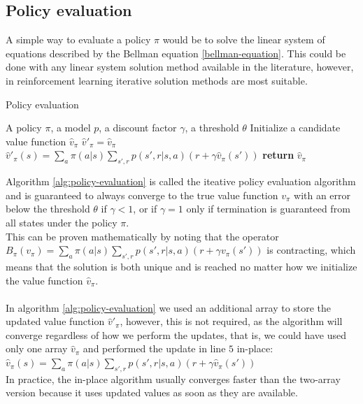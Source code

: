 \subsection{Policy evaluation}
A simple way to evaluate a policy $\pi$ would be to solve the linear system of equations described by the Bellman equation \eqref{bellman-equation}. This could be done with any linear system solution method available in the literature, however, in reinforcement learning iterative solution methods are most suitable.
\begin{algorithm}[H]
    \caption{Policy evaluation}
    \label{alg:policy-evaluation}
    \begin{algorithmic}[1]
        \Require A policy $\pi$, a model $p$, a discount factor $\gamma$, a threshold $\theta$
        \State Initialize a candidate value function $\hat{v}_{\pi}$
            \State $\hat{v}'_{\pi} = \hat{v}_{\pi}$
                \State $\hat{v}'_{\pi}(s) = \sum_a \pi(a | s) \sum_{s', r} p(s', r | s, a) (r + \gamma \hat{v}_{\pi}(s'))$
            \EndFor
                \State \textbf{return} $\hat{v}_{\pi}$
            \EndIf
        \EndWhile
    \end{algorithmic}
\end{algorithm}
Algorithm \ref{alg:policy-evaluation} is called the iteative policy evaluation algorithm and is guaranteed to always converge to the true value function $v_{\pi}$ with an error below the threshold $\theta$ if $\gamma < 1$, or if $\gamma = 1$ only if termination is guaranteed from all states under the policy $\pi$.\\
This can be proven mathematically by noting that the operator $B_{\pi}(v_{\pi}) = \sum_a \pi(a | s) \sum_{s', r} p(s', r | s, a) (r + \gamma v_{\pi}(s'))$ is contracting, which means that the solution is both unique and is reached no matter how we initialize the value function $\hat{v}_{\pi}$.\\\\
In algorithm \ref{alg:policy-evaluation} we used an additional array to store the updated value function $\hat{v}'_{\pi}$, however, this is not required, as the algorithm will converge regardless of how we perform the updates, that is, we could have used only one array $\hat{v}_{\pi}$ and performed the update in line $5$ in-place:\\
$\hat{v}_{\pi}(s) = \sum_a \pi(a | s) \sum_{s', r} p(s', r | s, a) (r + \gamma \hat{v}_{\pi}(s'))$\\
In practice, the in-place algorithm usually converges faster than the two-array version because it uses updated values as soon as they are available.

